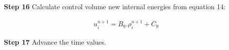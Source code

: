 \documentclass[11pt,letterpaper,titlepage]{article}
\begin{document}
\vspace{0.5cm}\noindent
\textbf{Step 16}\newline
Calculate control volume new internal energies from equation 14:

\begin{equation*}
\begin{aligned}
u_{i}^{n+1} = B_9.\rho_{i}^{n+1}+C_9
\end{aligned}
\end{equation*}




\vspace{0.5cm}\noindent
\textbf{Step 17}\newline
Advance the time values.













\newpage
{}
\begin{thebibliography}{1}

	
\end{thebibliography}
\end{document}
